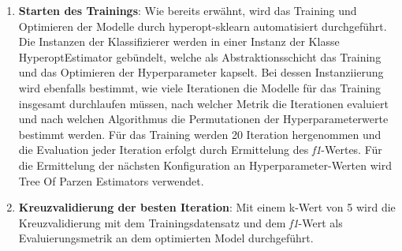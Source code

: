 \begin{enumerate}
    \item \textbf{Starten des Trainings}: Wie bereits erwähnt, wird das Training und Optimieren der Modelle durch hyperopt-sklearn automatisiert durchgeführt. Die Instanzen der Klassifizierer werden in einer Instanz der Klasse HyperoptEstimator gebündelt, welche als Abstraktionsschicht das Training und das Optimieren der Hyperparameter kapselt. Bei dessen Instanziierung wird ebenfalls bestimmt, wie viele Iterationen die Modelle für das Training insgesamt durchlaufen müssen, nach welcher Metrik die Iterationen evaluiert und nach welchen Algorithmus die Permutationen der Hyperparameterwerte bestimmt werden. 
    Für das Training werden 20 Iteration hergenommen und die Evaluation jeder Iteration erfolgt durch Ermittelung des \textit{f1}-Wertes. Für die Ermittelung der nächsten Konfiguration an Hyperparameter-Werten wird Tree Of Parzen Estimators verwendet.
    \item \textbf{Kreuzvalidierung der besten Iteration}: Mit einem k-Wert von 5 wird die Kreuzvalidierung mit dem Trainingsdatensatz und dem \textit{f1}-Wert als Evaluierungsmetrik an dem optimierten Model durchgeführt.
\end{enumerate}